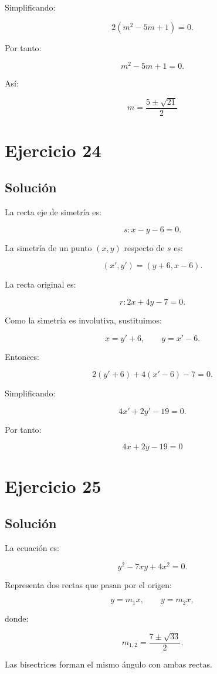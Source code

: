 \documentclass[11pt,a4paper]{article}
\begin{document}
Simplificando:

\[
2(m^2-5m+1)=0.
\]

Por tanto:

\[
m^2-5m+1=0.
\]

Así:

\[
\boxed{
m
=
\frac{5\pm\sqrt{21}}{2}
}
\]

\section{Ejercicio 24}
\subsection{Solución}

La recta eje de simetría es:

\[
s:
x-y-6=0.
\]

La simetría de un punto \((x,y)\) respecto de \(s\) es:

\[
(x',y')
=
(y+6,x-6).
\]

La recta original es:

\[
r:
2x+4y-7=0.
\]

Como la simetría es involutiva, sustituimos:

\[
x=y'+6,
\qquad
y=x'-6.
\]

Entonces:

\[
2(y'+6)
+
4(x'-6)
-
7
=
0.
\]

Simplificando:

\[
4x'+2y'-19=0.
\]

Por tanto:

\[
\boxed{
4x+2y-19=0
}
\]

\section{Ejercicio 25}
\subsection{Solución}

La ecuación es:

\[
y^2-7xy+4x^2=0.
\]

Representa dos rectas que pasan por el origen:

\[
y=m_1x,
\qquad
y=m_2x,
\]

donde:

\[
m_{1,2}
=
\frac{7\pm\sqrt{33}}{2}.
\]

Las bisectrices forman el mismo ángulo con ambas rectas.
\end{document}
